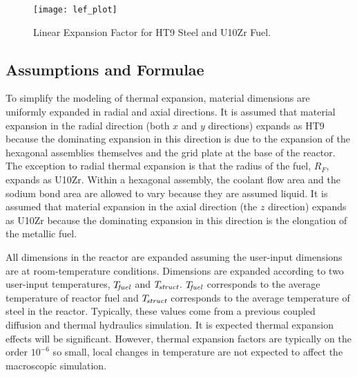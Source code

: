     \begin{figure}
      \centering
      \texttt{[image: lef\_plot]}
      \caption{Linear Expansion Factor for HT9 Steel and U10Zr Fuel.}
      \label{fig:lef_plot}
    \end{figure}
    
  \subsection{Assumptions and Formulae}
  \label{sec:model_details__assumptions_and_formulae}
    To simplify the modeling of thermal expansion, material dimensions are
    uniformly expanded in radial and axial directions. It is assumed that 
    material expansion in the radial direction (both $x$ and $y$ directions) 
    expands as HT9 because the dominating expansion in this direction is due to 
    the expansion of the hexagonal assemblies themselves and the grid plate at
    the base of the reactor. The exception to radial thermal expansion is that 
    the radius of the fuel, $R_F$, expands as U10Zr.  Within a hexagonal 
    assembly, the coolant flow area and the sodium bond area are allowed to 
    vary because they are assumed liquid.  It is assumed that material 
    expansion in the axial direction (the $z$ direction) expands as U10Zr 
    because the dominating expansion in this direction is the elongation of the 
    metallic fuel. 
    
    All dimensions in the reactor are expanded assuming the user-input 
    dimensions are at room-temperature conditions. Dimensions are expanded
    according to two user-input temperatures, ${T_{\!\mbox{\scriptsize \em fuel}}}$ and $T_{\!\mbox{\scriptsize \em struct}}$.
    ${T_{\!\mbox{\scriptsize \em fuel}}}$ corresponds to the average temperature of reactor fuel and
    $T_{\!\mbox{\scriptsize \em struct}}$ corresponds to the average temperature of steel in the
    reactor. Typically, these values come from a previous coupled diffusion and
    thermal hydraulics simulation.
    It is expected thermal expansion 
    effects will be significant. However, thermal expansion factors are 
    typically on the order $10^{-6}$ so small, local changes in temperature are 
    not expected to affect the macroscopic simulation.

